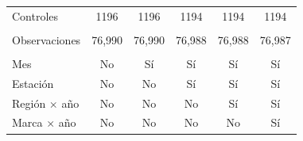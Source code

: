 \begin{tabular}{lccccc}
   Controles            & 1196            & 1196    & 1194    & 1194    & 1194\\  
    \\
   Observaciones        & 76,990          & 76,990  & 76,988  & 76,988  & 76,987\\  
    \\
   Mes                  & No              & Sí      & Sí      & Sí      & Sí\\  
   Estación             & No              & No      & Sí      & Sí      & Sí\\  
   Región $\times$ año  & No              & No      & No      & Sí      & Sí\\  
   Marca $\times$ año   & No              & No      & No      & No      & Sí\\  
   \bottomrule
\end{tabular}
\par\endgroup


